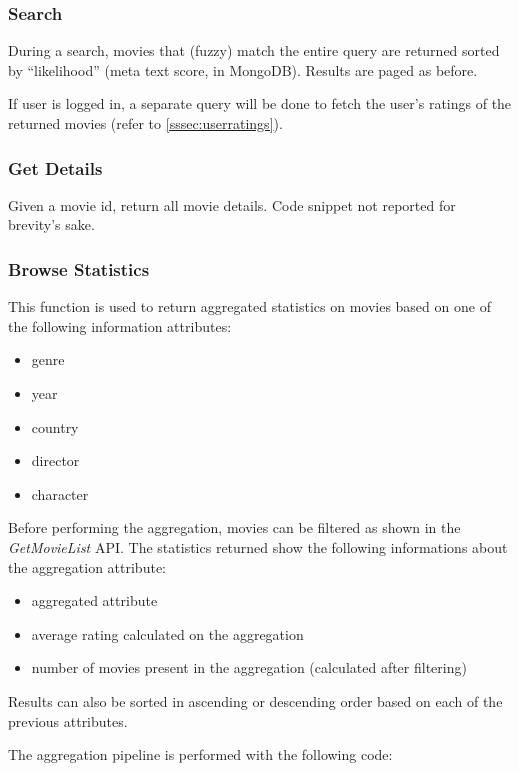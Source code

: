\documentclass[11pt]{article}
\begin{document}
\subsubsection{Search}
During a search, movies that (fuzzy) match the entire query are returned sorted
by ``likelihood'' (meta text score, in MongoDB). Results are paged as before.

If user is logged in, a separate query will be done to fetch the user's ratings of the returned movies (refer to \ref{sssec:userratings}).



\subsubsection{Get Details}
Given a movie id, return all movie details. Code snippet not reported for brevity's sake.

\subsubsection{Browse Statistics}
This function is used to return aggregated statistics on movies based on one of the following information attributes:
\begin{itemize}
	\item genre
	\item year
	\item country
	\item director
	\item character
\end{itemize}
Before performing the aggregation, movies can be filtered as shown in the \textit{GetMovieList} API.
The statistics returned show the following informations about the aggregation attribute:
\begin{itemize}
	\item aggregated attribute
	\item average rating calculated on the aggregation
	\item number of movies present in the aggregation (calculated after filtering)
\end{itemize}
Results can also be sorted in ascending or descending order based on each of the previous attributes.

The aggregation pipeline is performed with the following code:


\end{document}
